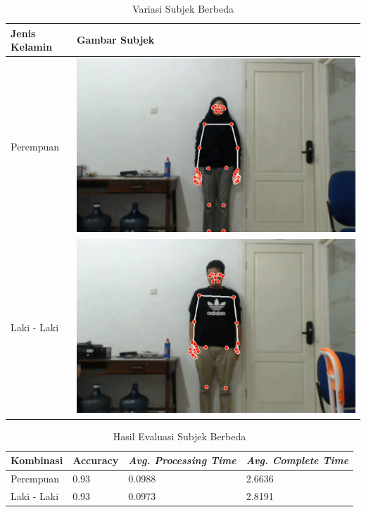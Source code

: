 \begin{table}[H]
  \caption{Variasi Subjek Berbeda}
  \label{tb:kondisisubjek}
  \centering
  \begin{tabular}{ll}
    \hline
    \textbf{Jenis Kelamin} & \textbf{Gambar Subjek} \\
    \hline
    Perempuan & \includegraphics[scale=0.12]{gambar/bab4-rani.png} \\
    \hline
    Laki - Laki & \includegraphics[scale=0.12]{gambar/bab4-evan.png} \\
    \hline
  \end{tabular}
\end{table}

\begin{table}[H]
  \caption{Hasil Evaluasi Subjek Berbeda}
  \label{tb:evaluasiSubjek}
  \centering
  \begin{tabular}{llll}
    \hline
    \textbf{Kombinasi} & \textbf{Accuracy} & \emph{\textbf{Avg. Processing Time}} & \emph{\textbf{Avg. Complete Time}} \\
    \hline
    Perempuan & 0.93 & 0.0988 & 2.6636 \\
    Laki - Laki & 0.93 & 0.0973 & 2.8191 \\
    \hline
  \end{tabular}
\end{table}

